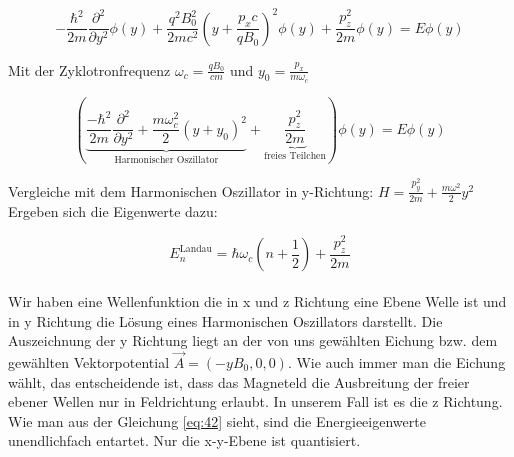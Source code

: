 \[ -\frac{ \hbar^2}{2m} \frac{\partial^2}{\partial y^2}\phi(y) + \frac{q^2 B_0^2}{2mc^2} (y +  \frac{p_xc}{qB_0} )^2\phi(y) +\frac{p_z^2}{2m}\phi(y)  = E \phi(y) \]


Mit der Zyklotronfrequenz \( \omega_c = \frac{qB_0}{cm} \) und \(y_0 = \frac{p_x}{m\omega_c}\)

\[  \left( \underbrace{ \frac{- \hbar^2}{2m} \frac{\partial^2}{\partial y^2} + \frac{m\omega_c^2}{2} (y +  y_0 )^2}_{\text{Harmonischer Oszillator}} +\underbrace{ \frac{p_z^2}{2m}}_{\text{freies Teilchen}}  \right)\phi(y) = E \phi(y) \]


Vergleiche mit dem Harmonischen Oszillator in y-Richtung: \( H = \frac{p^2_y}{2m} + \frac{m\omega^2}{2}y^2 \) Ergeben sich die Eigenwerte dazu:

\begin{equation}
\label{eq:42}
 \boxed{E_n^{\text{Landau}} = \hbar\omega_c(n+\frac{1}{2}) + \frac{p_z^2}{2m} }
\end{equation}
\\
Wir haben eine Wellenfunktion die in x und z Richtung eine Ebene Welle ist und in y Richtung die Lösung eines Harmonischen Oszillators darstellt. Die Auszeichnung der y Richtung liegt an der von uns gewählten Eichung bzw. dem gewählten Vektorpotential  \(\vec A = (-yB_0,0,0)\). Wie auch immer man die Eichung wählt, das entscheidende ist, dass das Magneteld die Ausbreitung der freier ebener Wellen nur in Feldrichtung erlaubt. In unserem Fall ist es die z Richtung. Wie man aus der Gleichung \eqref{eq:42} sieht, sind die Energieeigenwerte unendlichfach entartet. Nur die x-y-Ebene ist quantisiert.






